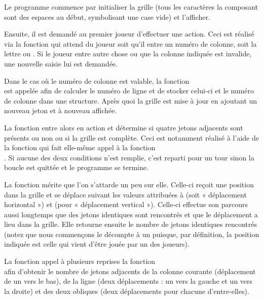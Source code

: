 Le programme commence par initialiser la grille (tous les caractères la
composant sont des espaces au début, symbolisant une case vide) et
l'afficher.

Ensuite, il est demandé au premier joueur d'effectuer une action. Ceci
est réalisé via la fonction  qui attend du
joueur soit qu'il entre un numéro de colonne, soit la lettre 
ou . Si le joueur entre autre chose ou que la colonne indiquée
est invalide, une nouvelle saisie lui est demandée.

Dans le cas où le numéro de colonne est valable, la fonction\\
 est appelée afin de calculer le numéro de
ligne et de stocker celui-ci et le numéro de colonne dans une structure.
Après quoi la grille est mise à jour en ajoutant un nouveau jeton et à
nouveau affichée.

La fonction  entre alors en action et détermine si
quatre jetons adjacents sont présents ou non ou si la grille est
complète. Ceci est notamment réalisé à l'aide de la fonction
 qui fait elle-même appel à la
fonction\\ . Si aucune des
deux conditions n'est remplie, c'est reparti pour un tour sinon la
boucle est quittée et le programme se termine.

La fonction  mérite que l'on
s'attarde un peu sur elle. Celle-ci reçoit une position dans la grille
et se déplace suivant les valeurs attribuées à  (soit «
déplacement horizontal ») et  (pour « déplacement
vertical »). Celle-ci effectue son parcours aussi longtemps que des
jetons identiques sont rencontrés et que le déplacement a lieu dans la
grille. Elle retourne ensuite le nombre de jetons identiques rencontrés
(notez que nous commençons le décompte à un puisque, par définition, la
position indiquée est celle qui vient d'être jouée par un des joueurs).

La fonction  appel à plusieurs
reprises la fonction\\  afin
d'obtenir le nombre de jetons adjacents de la colonne courante
(déplacement de un vers le bas), de la ligne (deux déplacements : un
vers la gauche et un vers la droite) et des deux obliques (deux
déplacements pour chacune d'entre-elles).

